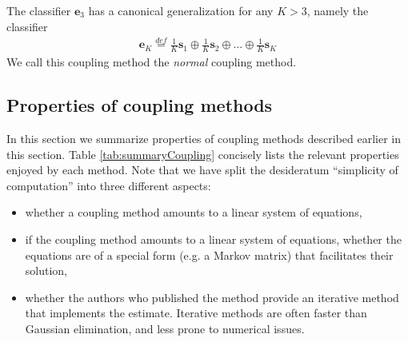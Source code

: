 The classifier $\boldsymbol{e}_3$ has a canonical generalization for any $K>3$, namely the classifier
\begin{align}
\boldsymbol{e}_K \stackrel{def}{=} \frac1K \boldsymbol{s}_1 \oplus \frac1K \boldsymbol{s}_2 \oplus \ldots \oplus \frac 1K \boldsymbol{s}_K  \label{eq:bc1}
\end{align}
We call this coupling method the \emph{normal} coupling method.

\subsection{Properties of coupling methods}

In this section  we summarize properties of coupling methods described earlier in this section.  Table \ref{tab:summaryCoupling} concisely lists the relevant properties enjoyed by each method. Note that we have split the desideratum ``simplicity of computation'' into three different aspects:
\begin{itemize}
	\item whether a coupling method amounts to a linear system of equations,
	\item if the coupling method amounts to a linear system of equations, whether the equations are of a special form (e.g. a Markov matrix) that facilitates their solution,
	\item whether the authors who published the method provide an iterative method that implements the estimate. Iterative methods are often  faster than Gaussian elimination, and less prone to numerical issues.
\end{itemize}




